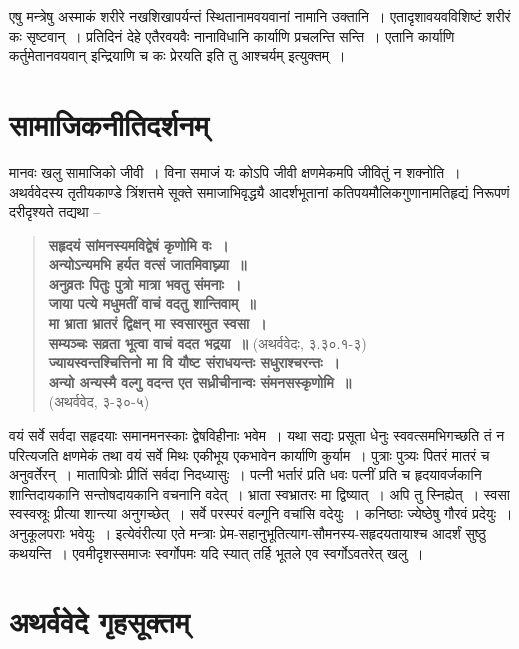{एषु मन्त्रेषु अस्माकं शरीरे नखशिखापर्यन्तं स्थितानामवयवानां नामानि उक्तानि~। एतादृशावयवविशिष्टं शरीरं कः सृष्टवान्~। प्रतिदिनं देहे एतैरवयवैः नानाविधानि कार्याणि प्रचलन्ति सन्ति~। एतानि कार्याणि कर्तुमेतानवयवान् इन्द्रियाणि च कः प्रेरयति इति तु आश्चर्यम् इत्युक्तम्~। 


\section*{सामाजिकनीतिदर्शनम्}

मानवः खलु सामाजिको जीवी~। विना समाजं यः कोऽपि जीवी क्षणमेकमपि जीवितुं न शक्नोति~। अथर्ववेदस्य तृतीयकाण्डे त्रिंशत्तमे सूक्ते समाजाभिवृद्ध्यै आदर्शभूतानां कतिपयमौलिकगुणानामतिहृद्यं निरूपणं दरीदृश्यते तद्यथा –

\begin{verse}
\textbf{सहृदयं सांमनस्यमविद्वेषं कृणोमि वः~। }\\
\textbf{अन्योऽन्यमभि हर्यत वत्सं जातमिवाघ्न्या~॥}\\
\textbf{अनुव्रतः पितुः पुत्रो मात्रा भवतु संमनाः~। }\\
\textbf{जाया पत्ये मधुमतीं वाचं वदतु शान्तिवाम्~॥}\\
\textbf{मा भ्राता भ्रातरं द्विक्षन् मा स्वसारमुत स्वसा~। }\\
\textbf{सम्यञ्चः सव्रता भूत्वा वाचं वदत भद्रया~॥} (अथर्ववेदः, ३.३०.१-३)\\
\textbf{ज्यायस्वन्तश्चित्तिनो मा वि यौष्ट संराधयन्तः सधुराश्चरन्तः~। }\\
\textbf{अन्यो अन्यस्मै वल्गु वदन्त एत सध्रीचीनान्वः संमनसस्कृणोमि~॥}\\
\hspace{6cm}(अथर्ववेद, ३-३०-५)
\end{verse}

वयं सर्वे सर्वदा सहृदयाः समानमनस्काः द्वेषविहीनाः भवेम~। यथा सद्यः प्रसूता धेनुः स्ववत्समभिगच्छति तं न परित्यजति क्षणमेकं तथा वयं सर्वे मिथः एकीभूय एकभावेन कार्याणि कुर्याम~। पुत्राः पुत्र्यः पितरं मातरं च अनुवर्तेरन्~। मातापित्रोः प्रीतिं सर्वदा निदध्यासुः~। पत्नी भर्तारं प्रति धवः पत्नीं प्रति च हृदयावर्जकानि शान्तिदायकानि सन्तोषदायकानि वचनानि वदेत्~। भ्राता स्वभ्रातरः मा द्विष्यात्~। अपि तु स्निह्येत्~। स्वसा स्वस्वस्रूः प्रीत्या शान्त्या अनुगच्छेत्~। सर्वे परस्परं वल्गूनि वचांसि वदेयुः~। कनिष्ठाः ज्येष्ठेषु गौरवं प्रदेयुः~। अनुकूलपराः भवेयुः~। इत्येवंरीत्या एते मन्त्राः प्रेम-सहानुभूतित्याग-सौमनस्य-सहृदयतायाश्च आदर्शं सुष्ठु कथयन्ति~। एवमीदृशस्समाजः स्वर्गोपमः यदि स्यात् तर्हि भूतले एव स्वर्गोऽवतरेत् खलु~। 


\section*{अथर्ववेदे गृहसूक्तम्}

}
